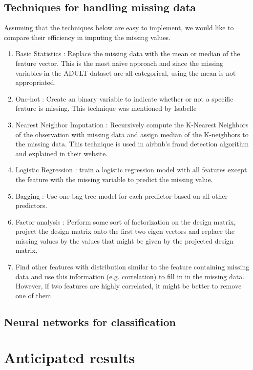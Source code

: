 \documentclass[12pt]{article}
\begin{document}

\subsection{Techniques for handling missing data}
Assuming that the techniques below are easy to implement, we would like to compare their efficiency in imputing the missing values.

\begin{enumerate}
\item Basic Statistics : Replace the missing data with the mean or median of the feature vector. This is the most naive approach and since the missing variables in the ADULT dataset are all categorical, using the mean is not appropriated.
\item One-hot : Create an binary variable to indicate whether or not a specific feature is missing. This technique was mentioned by Isabelle
\item Nearest Neighbor Imputation : Recursively compute the K-Nearest Neighbors of the observation with missing data and assign median of the K-neighbors to the missing data. This technique is used in airbnb's fraud detection algorithm and explained in their website.
\item Logistic Regression : train a logistic regression model with all features except the feature with the missing variable to predict the missing value.
\item Bagging : Use one bag tree model for each predictor based on all other
   predictors.
\item Factor analysis : Perform some sort of factorization on the design matrix, project the design matrix onto the first two eigen vectors and replace the missing values by the values that might be given by the projected design matrix.
\item Find other features with distribution similar to the feature containing missing data and use this information (e.g. correlation) to fill in in the missing data. However, if two features are highly correlated, it might be better to remove one of them.
\end{enumerate}

\subsection{Neural networks for classification}

\section{Anticipated results}
\end{document}
